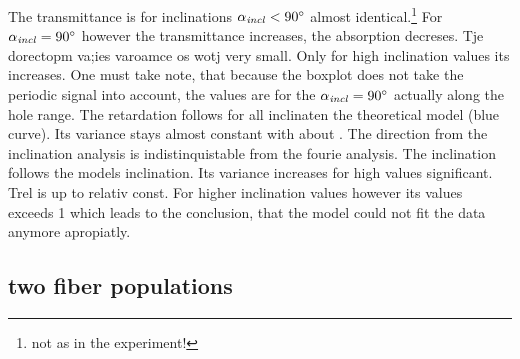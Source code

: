 The transmittance is for inclinations $\textnormal{$\alpha_{\mathit{incl}}$}<\SI{90}{\degree}$ almost identical.\footnote{not as in the experiment!}
For $\textnormal{$\alpha_{\mathit{incl}}$}= \SI{90}{\degree}$ however the transmittance increases, \ie{} the absorption decreses.
Tje dorectopm va;ies varoamce os wotj \dummy{} very small.
Only for high inclination values its increases.
One must take note, that because the boxplot does not take the periodic signal into account, the values are for the $\textnormal{$\alpha_{\mathit{incl}}$}= \SI{90}{\degree}$ actually along the hole range.
The retardation follows for all inclinaten the theoretical model (blue curve).
Its variance stays almost constant with about \dummy{}.
The direction from the inclination analysis is indistinquistable from the fourie analysis.
The inclination follows the models inclination.
Its variance increases for high values significant.
Trel is up to \dummy{} relativ const.
For higher inclination values however its values exceeds 1 which leads to the conclusion, that the model could not fit the data anymore apropiatly.
% 
% 
% 
\subsection{two fiber populations}
% 

